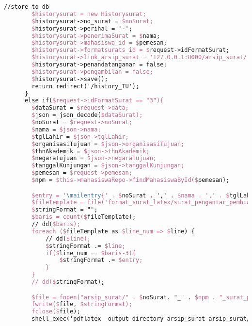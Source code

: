 \begin{lstlisting}[language=tex,basicstyle=\tiny,caption=HistorysuratController.php]
        //store to db
        $historysurat = new Historysurat;
        $historysurat->no_surat = $noSurat;
        $historysurat->perihal = '-';
        $historysurat->penerimaSurat = $nama;
        $historysurat->mahasiswa_id = $pemesan;
        $historysurat->formatsurats_id = $request->idFormatSurat;
        $historysurat->link_arsip_surat = '127.0.0.1:8000/arsip_surat/' . $noSurat. '_' . $npm . '_surat_keterangan_mahasiswa_aktif.pdf';
        $historysurat->penandatanganan = false;
        $historysurat->pengambilan = false;
        $historysurat->save();
        return redirect('/history_TU');
      }
      else if($request->idFormatSurat == "3"){
        $dataSurat = $request->data;
        $json = json_decode($dataSurat);
        $noSurat = $request->noSurat;
        $nama = $json->nama;
        $tglLahir = $json->tglLahir;
        $organisasiTujuan = $json->organisasiTujuan;
        $thnAkademik = $json->thnAkademik;
        $negaraTujuan = $json->negaraTujuan;
        $tanggalKunjungan = $json->tanggalKunjungan;
        $pemesan = $request->pemesan;
        $npm = $this->mahasiswaRepo->findMahasiswaById($pemesan);

        $entry = '\mailentry{' . $noSurat . ',' . $nama . ',' . $tglLahir . ',' . $organisasiTujuan . ',' . $thnAkademik . ',' . $negaraTujuan . ',' . $tanggalKunjungan . '}';
        $fileTemplate = file('format_surat_latex/surat_pengantar_pembuatan_visa.tex');
        $stringFormat = "";
        $baris = count($fileTemplate);
        // dd($baris);
        foreach ($fileTemplate as $line_num => $line) {
            // dd($line);
            $stringFormat .= $line;
            if($line_num == $baris-3){
                $stringFormat .= $entry;
            }
        }
        // dd($stringFormat);

        $file = fopen("arsip_surat/" . $noSurat. "_" . $npm . "_surat_pengantar_pembuatan_visa.tex", "w");
        fwrite($file, $stringFormat);
        fclose($file);
        shell_exec('pdflatex -output-directory arsip_surat arsip_surat/' . $noSurat . '_' . $npm . '_surat_pengantar_pembuatan_visa.tex');


\end{lstlisting}
